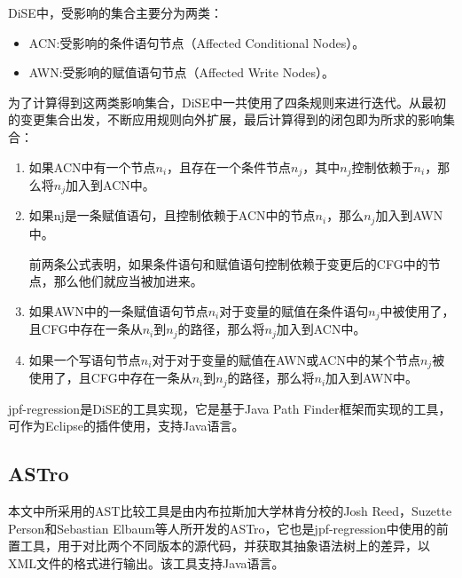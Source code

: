 DiSE中，受影响的集合主要分为两类：
\begin{itemize}
	\item ACN:受影响的条件语句节点（Affected Conditional Nodes）。
	\item AWN:受影响的赋值语句节点（Affected Write Nodes）。
\end{itemize}

为了计算得到这两类影响集合，DiSE中一共使用了四条规则来进行迭代。从最初的变更集合出发，不断应用规则向外扩展，最后计算得到的闭包即为所求的影响集合：
\begin{enumerate}
	\item 如果ACN中有一个节点$n_i$，且存在一个条件节点$n_j$，其中$n_j$控制依赖于$n_i$，那么将$n_j$加入到ACN中。
	\item 如果nj是一条赋值语句，且控制依赖于ACN中的节点$n_i$，那么$n_j$加入到AWN中。
	     
	前两条公式表明，如果条件语句和赋值语句控制依赖于变更后的CFG中的节点，那么他们就应当被加进来。
	     
	\item 如果AWN中的一条赋值语句节点$n_i$对于变量的赋值在条件语句$n_j$中被使用了，且CFG中存在一条从$n_i$到$n_j$的路径，那么将$n_j$加入到ACN中。

	\item 如果一个写语句节点$n_i$对于对于变量的赋值在AWN或ACN中的某个节点$n_j$被使用了，且CFG中存在一条从$n_i$到$n_j$的路径，那么将$n_i$加入到AWN中。

\end{enumerate}

jpf-regression是DiSE的工具实现，它是基于Java Path Finder框架\cite{havelund2000model}而实现的工具，可作为Eclipse的插件使用，支持Java语言。

\subsection{ASTro}	

	本文中所采用的AST比较工具是由内布拉斯加大学林肯分校的Josh Reed，Suzette Person和Sebastian Elbaum等人所开发的ASTro，它也是jpf-regression中使用的前置工具，用于对比两个不同版本的源代码，并获取其抽象语法树上的差异，以XML文件的格式进行输出。该工具支持Java语言。
	